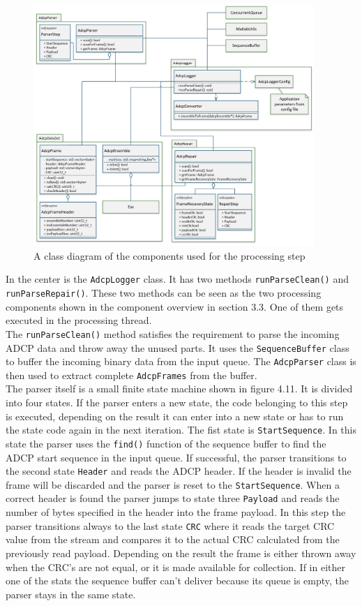 \begin{figure}[h]
\centering
      \includegraphics[width=0.95\textwidth]{logger_class}
        \caption{A class diagram of the components used for the processing step}
\end{figure}

In the center is the \texttt{AdcpLogger} class. It has two methods \texttt{runParseClean()} and \texttt{runParseRepair()}. These two methods can be seen as the two processing components shown in the component overview in section 3.3. One of them gets executed in the processing thread.\\
The \texttt{runParseClean()} method satisfies the requirement to parse the incoming ADCP data and throw away the unused parts. It uses the \texttt{SequenceBuffer} class to buffer the incoming binary data from the input queue. The \texttt{AdcpParser} class is then used to extract complete \texttt{AdcpFrames} from the buffer.\\
The parser itself is a small finite state machine shown in figure 4.11. It is divided into four states. If the parser enters a new state, the code belonging to this step is executed, depending on the result it can enter into a new state or has to run the state code again in the next iteration. The fist state is \texttt{StartSequence}. In this state the parser uses the \texttt{find()} function of the sequence buffer to find the ADCP start sequence in the input queue. If successful, the parser transitions to the second state \texttt{Header} and reads the ADCP header. If the header is invalid the frame will be discarded and the parser is reset to the \texttt{StartSequence}. When a correct header is found the parser jumps to state three \texttt{Payload} and reads the number of bytes specified in the header into the frame payload. In this step the parser transitions always to the last state \texttt{CRC} where it reads the target CRC value from the stream and compares it to the actual CRC calculated from the previously read payload. Depending on the result the frame is either thrown away when the CRC's are not equal, or it is made available for collection. If in either one of the stats the sequence buffer can't deliver because its queue is empty, the parser stays in the same state.

